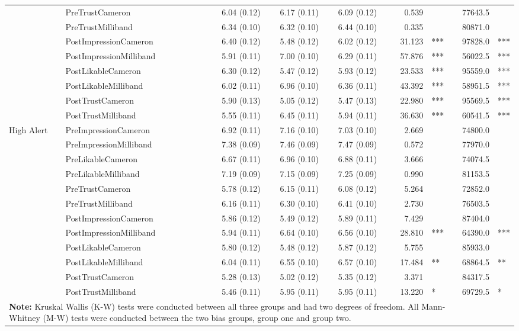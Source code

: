 \begin{table}[ht]
\begin{tabular}{llrrrrlrl}
   & PreTrustCameron & 6.04 (0.12) & 6.17 (0.11) & 6.09 (0.12) & 0.539 &   & 77643.5 &   \\ 
   & PreTrustMilliband & 6.34 (0.10) & 6.32 (0.10) & 6.44 (0.10) & 0.335 &   & 80871.0 &   \\ 
   & PostImpressionCameron & 6.40 (0.12) & 5.48 (0.12) & 6.02 (0.12) & 31.123 & *** & 97828.0 & *** \\ 
   & PostImpressionMilliband & 5.91 (0.11) & 7.00 (0.10) & 6.29 (0.11) & 57.876 & *** & 56022.5 & *** \\ 
   & PostLikableCameron & 6.30 (0.12) & 5.47 (0.12) & 5.93 (0.12) & 23.533 & *** & 95559.0 & *** \\ 
   & PostLikableMilliband & 6.02 (0.11) & 6.96 (0.10) & 6.36 (0.11) & 43.392 & *** & 58951.5 & *** \\ 
   & PostTrustCameron & 5.90 (0.13) & 5.05 (0.12) & 5.47 (0.13) & 22.980 & *** & 95569.5 & *** \\ 
   & PostTrustMilliband & 5.55 (0.11) & 6.45 (0.11) & 5.94 (0.11) & 36.630 & *** & 60541.5 & *** \\ 
  High Alert & PreImpressionCameron & 6.92 (0.11) & 7.16 (0.10) & 7.03 (0.10) & 2.669 &   & 74800.0 &   \\ 
   & PreImpressionMilliband & 7.38 (0.09) & 7.46 (0.09) & 7.47 (0.09) & 0.572 &   & 77970.0 &   \\ 
   & PreLikableCameron & 6.67 (0.11) & 6.96 (0.10) & 6.88 (0.11) & 3.666 &   & 74074.5 &   \\ 
   & PreLikableMilliband & 7.19 (0.09) & 7.15 (0.09) & 7.25 (0.09) & 0.990 &   & 81153.5 &   \\ 
   & PreTrustCameron & 5.78 (0.12) & 6.15 (0.11) & 6.08 (0.12) & 5.264 &   & 72852.0 &   \\ 
   & PreTrustMilliband & 6.16 (0.11) & 6.30 (0.10) & 6.41 (0.10) & 2.730 &   & 76503.5 &   \\ 
   & PostImpressionCameron & 5.86 (0.12) & 5.49 (0.12) & 5.89 (0.11) & 7.429 &   & 87404.0 &   \\ 
   & PostImpressionMilliband & 5.94 (0.11) & 6.64 (0.10) & 6.56 (0.10) & 28.810 & *** & 64390.0 & *** \\ 
   & PostLikableCameron & 5.80 (0.12) & 5.48 (0.12) & 5.87 (0.12) & 5.755 &   & 85933.0 &   \\ 
   & PostLikableMilliband & 6.04 (0.11) & 6.55 (0.10) & 6.57 (0.10) & 17.484 & ** & 68864.5 & ** \\ 
   & PostTrustCameron & 5.28 (0.13) & 5.02 (0.12) & 5.35 (0.12) & 3.371 &   & 84317.5 &   \\ 
   & PostTrustMilliband & 5.46 (0.11) & 5.95 (0.11) & 5.95 (0.11) & 13.220 & * & 69729.5 & * \\ 
   \hline  \multicolumn{7}{L{16cm}}{\textbf{Note: } 
                                               Kruskal Wallis (K-W) tests were conducted between all three groups 
                                               and had two degrees of freedom. All Mann-Whitney (M-W) tests were
                                               conducted between the two bias groups, group one and group two.} \\ \hline
\end{tabular}
\end{table}
